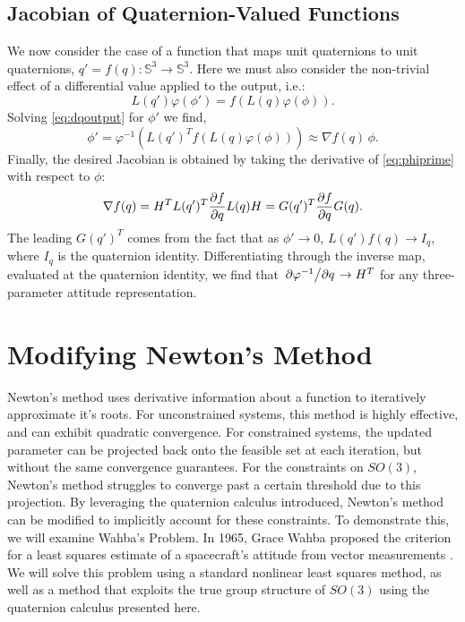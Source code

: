 \documentclass[letterpaper, 10 pt, conference]{ieeeconf}  %
\newcommand{\Q}{\mathbb{S}^3}
\begin{document}
    \subsection{Jacobian of Quaternion-Valued Functions}
        We now consider the case of a function that maps unit quaternions to unit
        quaternions, $q' = f(q) : \Q \to \Q$. Here we must also consider the non-trivial
        effect of a differential value applied to the output, i.e.:
        \begin{equation} \label{eq:dqoutput}
            L(q') \varphi(\phi') = f(L(q)\varphi(\phi)) .
        \end{equation}
        Solving \eqref{eq:dqoutput} for $\phi'$ we find,
        \begin{equation} \label{eq:phiprime}
            \phi' = \varphi^{-1} \left( L(q')^T f(L(q)\varphi(\phi)) \right) \approx \nabla f(q) \, \phi.
        \end{equation}
        Finally, the desired Jacobian is obtained by taking the derivative of
        \eqref{eq:phiprime} with respect to $\phi$:
        \begin{equation} \label{eq:quat_jacobian}
            \nabla f(q) = H^T L(q')^T \pdv{f}{q} L(q) H = G(q')^T \pdv{f}{q} G(q).
        \end{equation}
        The leading $G(q')^T$ comes from the fact that as $\phi' \to 0$, $L(q') f(q) \to
        I_q$, where $I_q$ is the quaternion identity. Differentiating through the inverse
        map, evaluated at the quaternion identity, we find that $\pdv*{\varphi^{-1}}{q}
        \to H^T$ for any three-parameter attitude representation.


\section{Modifying Newton's Method} \label{sec:Wahbas}
    Newton's method uses derivative information about a function to iteratively approximate it's roots. For unconstrained systems, this method is highly effective, and can exhibit quadratic convergence.  For constrained systems, the updated parameter can be projected back onto the feasible set at each iteration, but without the same convergence guarantees. For the constraints on $SO(3)$, Newton's method struggles to converge past a certain threshold due to this projection. By leveraging the quaternion calculus introduced, Newton's method can be modified to implicitly account for these constraints. To demonstrate this, we will examine Wahba's Problem. In 1965, Grace Wahba proposed the criterion for a least squares estimate of a spacecraft's attitude from vector measurements \cite{markley2014fundamentals}. We will solve this problem using a standard nonlinear least squares method, as well as a method that exploits the true group structure of $SO(3)$ using the quaternion calculus presented here. 
    
\end{document}

